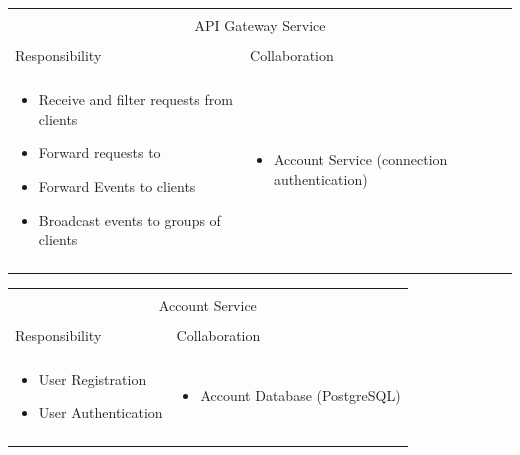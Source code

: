 \noindent
\begin{tabular}{|l|l|}
    \cline{1-2}
    \multicolumn{2}{|c|}{} \\[-0.3cm]
    \multicolumn{2}{|c|}{API Gateway Service} \\ 
    \multicolumn{2}{|c|}{} \\[-0.3cm]
    \cline{1-2}
    Responsibility & Collaboration \\
    \cline{1-2}
    & \\[-0.2cm]
    \begin{minipage}{0.47\textwidth}
        \begin{itemize}
          \item Receive and filter requests from clients
          \item Forward requests to \mss{}
          \item Forward Events to clients
          \item Broadcast events to groups of clients
        \end{itemize} 
    \end{minipage}
	&
    \begin{minipage}{0.47\textwidth}
        \begin{itemize}
          \item Account Service (connection authentication)
        \end{itemize} 
    \end{minipage}
	\\ & \\
    \hline
\end{tabular}

\vspace{0.5cm} \noindent 
\begin{tabular}{|l|l|}
    \cline{1-2}
    \multicolumn{2}{|c|}{} \\[-0.3cm]
    \multicolumn{2}{|c|}{Account Service} \\ 
    \multicolumn{2}{|c|}{} \\[-0.3cm]
    \cline{1-2}
    Responsibility & Collaboration \\
    \cline{1-2}
    & \\[-0.2cm]
    \begin{minipage}{0.47\textwidth}
        \begin{itemize}
          \item User Registration
          \item User Authentication
        \end{itemize} 
    \end{minipage}
	&
    \begin{minipage}{0.47\textwidth}
        \begin{itemize}
          \item Account Database (PostgreSQL)
        \end{itemize} 
    \end{minipage}
	\\ & \\
    \hline
\end{tabular}

